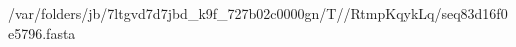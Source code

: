 \documentclass[10pt]{article}
\begin{document}
\begin{texshade}{/var/folders/jb/7ltgvd7d7jbd_k9f_727b02c0000gn/T//RtmpKqykLq/seq83d16f0e5796.fasta}
\hideconsensus
{}
\hidelogoscale
{}
\showlegend
\end{texshade}
\end{document}
